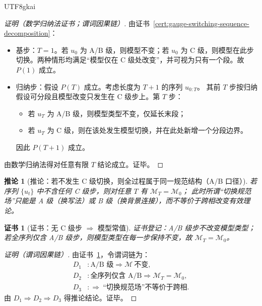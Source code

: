 \documentclass[12pt]{article}
\newtheorem{corollary}{推论}[section]
\newtheorem{Certificate}{证书}[section]
\begin{document}
\begin{CJK*}{UTF8}{gkai}
\begin{proof}[证明（数学归纳法证书；谓词因果链）]
由证书~\ref{cert:gauge-switching-sequence-decomposition}：
\begin{itemize}
  \item 基步：$T=1$。若 $u_0$ 为 A/B 级，则模型不变；若 $u_0$ 为 C 级，则模型在此步切换。两种情形均满足“模型仅在 C 级处改变”，并可视为只有一个段。故 $P(1)$ 成立。
  \item 归纳步：假设 $P(T)$ 成立。考虑长度为 $T+1$ 的序列 $u_{0:T}$。
  其前 $T$ 步按归纳假设可分段且模型改变只发生在 C 级步上。第 $T$ 步：
  \begin{itemize}
    \item 若 $u_T$ 为 A/B 级，则模型类型不变，仅延长末段；
    \item 若 $u_T$ 为 C 级，则在该处发生模型切换，并在此处新增一个分段边界。
  \end{itemize}
  因此 $P(T+1)$ 成立。
\end{itemize}
由数学归纳法得对任意有限 $T$ 结论成立。证毕。
\end{proof}

\begin{corollary}[推论：若不发生 C 级切换，则全过程属于同一规范结构（A/B 口径）]
\label{cor:no-structure-switch-implies-same-model}
若序列 $\{u_t\}$ 中不含任何 C 级步，则对任意 $T$ 有 $\mathcal{M}_T=\mathcal{M}_0$；
此时所谓“切换规范场”只能是 A 级（换写法）或 B 级（换背景连接），而不等价于跨相改变有效理论。
\end{corollary}

\begin{Certificate}[证书：无 C 级步 $\Rightarrow$ 模型常值]
\label{cert:no-structure-switch-implies-same-model}
证书登记：A/B 级步不改变模型类型；若全序列仅含 A/B 级步，则模型类型在每一步保持不变，故 $\mathcal{M}_T=\mathcal{M}_0$。
\end{Certificate}

\begin{proof}[证明（谓词因果链）]
由证书~\ref{cert:no-structure-switch-implies-same-model}，令谓词链为：
\[
\begin{aligned}
  D_1 &: \text{A/B 级}\Rightarrow \mathcal{M}\ \text{不变},\\
  D_2 &: \text{全序列仅含 A/B}\Rightarrow \mathcal{M}_T=\mathcal{M}_0,\\
  D_3 &: \Rightarrow\ \text{“切换规范场”不等价于跨相}.
\end{aligned}
\]
由 $D_1\Rightarrow D_2\Rightarrow D_3$ 得推论结论。证毕。
\end{proof}


\end{CJK*}
\end{document}
